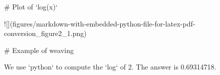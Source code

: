 


# Plot of `log(x)`



![](figures/markdown-with-embedded-python-file-for-latex-pdf-conversion_figure2_1.png)\



# Example of weaving

We use `python` to compute the `log` of 2. The answer is 0.69314718. 

